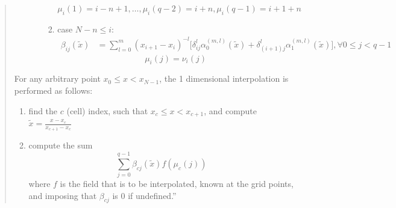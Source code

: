 \documentclass[11pt]{article}
\begin{document}
\begin{quotation}
\begin{enumerate}
\begin{enumerate}
\begin{enumerate}
\begin{equation}
                                    \mu_i(1) = i-n+1,
                                    \ldots,
                                    \mu_i(q-2) = i+n,
                                    \mu_i(q-1) = i+1+n
                                \end{equation}
                            \item
                                case $N-n \leq i$:
                                \begin{align}
                                    \beta_{ij}(\tilde{x}) &=
                                        \sum_{l = 0}^m
                                        (x_{i+1} - x_i)^{-l}
                                        \Big[\delta_{ij}^l \alpha_0^{(m, l)}(\tilde{x}) +
                                             \delta_{(i+1)j}^l \alpha_1^{(m, l)}(\tilde{x})\Big],
                                    \forall 0 \leq j < q-1
                                \end{align}
                                \begin{equation}
                                    \mu_i(j) = \nu_i(j)
                                \end{equation}
                        \end{enumerate}
                \end{enumerate}
        \end{enumerate}
        For any arbitrary point $x_0 \leq x < x_{N-1}$, the 1 dimensional interpolation is performed as follows:
        \begin{enumerate}
            \item
                find the $c$ (cell) index, such that $x_c \leq x < x_{c+1}$, and compute
                $\tilde{x} = \frac{x - x_c}{x_{c+1} - x_c}$
            \item
                compute the sum
                \begin{equation}
                    \sum_{j=0}^{q-1} \beta_{cj} (\tilde{x}) f(\mu_{c}(j))
                \end{equation}
                where $f$ is the field that is to be interpolated, known at the grid points, and
                imposing that $\beta_{cj}$ is 0 if undefined.''
        \end{enumerate}
\end{quotation}
\end{document}
